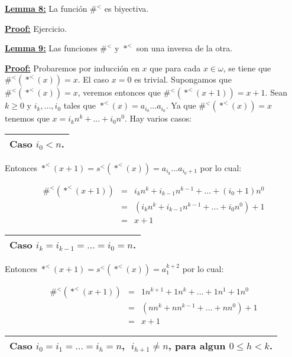   \QED


  \textbf{\underline{Lemma 8:}} La función $\#^{<}$ es biyectiva.

  \textbf{\underline{Proof:}} Ejercicio.

  \QED


  \textbf{\underline{Lemma 9:}} Las funciones $\#^{<}$ y $\ast^{<}$ son una inversa de la otra.

  \textbf{\underline{Proof:}} Probaremos por inducción en $x$ que para cada $x \in \omega$, se tiene que
    $\#^{<}(\ast^{<}(x)) = x$. El caso $x = 0$ es trivial. Supongamos que $\#^{<}(\ast^{<}(x)) = x$, veremos entonces
    que $\#^{<}(\ast^{<}(x + 1)) = x + 1$. Sean $k \geq 0$ y $i_{k}, ..., i_{0}$ tales que $\ast^{<}(x) = a_{i_{0}} ...
    a_{i_{0}}$. Ya que $\#^{<}(\ast^{<}(x)) = x$ tenemos que $x = i_{k} n^{k} + ... + i_{0} n^{0}$. Hay varios casos:

    \begin{tabular}{|c|}
      \hline Caso $i_{0}< n$.\\\hline
    \end{tabular}

    Entonces $\ast^{<}(x + 1)=s^{<}(\ast^{<}(x)) = a_{i_{k}} ... a_{i_{0} + 1}$ por lo cual:

    \begin{eqnarray}
      \nonumber \#^{<}(\ast^{<}(x+1)) &=& i_{k}n^{k}+i_{k-1}n^{k-1}+...+(i_{0}+1)n^{0} \\
      \nonumber &=& \left( i_{k}n^{k}+i_{k-1}n^{k-1}+...+i_{0}n^{0}\right) +1 \\
      \nonumber &=& x + 1
    \end{eqnarray}

    \begin{tabular}{|c|}
      \hline Caso $i_{k}=i_{k-1}=...=i_{0}=n$.\\\hline
    \end{tabular}
    Entonces $\ast^{<}(x + 1) = s^{<}(\ast^{<}(x)) = a_{1}^{k + 2}$ por lo cual:

    \begin{eqnarray}
      \nonumber \#^{<}(\ast^{<}(x+1)) &=& 1n^{k+1}+1n^{k}+...+1n^{1}+1n^{0} \\
      \nonumber &=& \left( nn^{k}+nn^{k-1}+...+nn^{0}\right) +1 \\
      \nonumber &=& x + 1
    \end{eqnarray}

    \begin{tabular}{|c|}
      \hline Caso $i_{0}=i_{1}=...=i_{h}=n$, $\;i_{h+1}\not=n$, para algun $ 0\leq h< k$.\\\hline
    \end{tabular}

